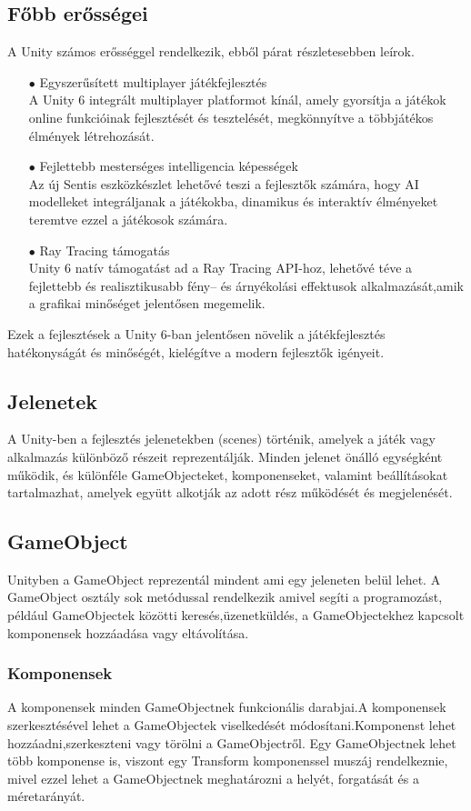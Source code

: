 \documentclass[
]{thesis-ekf}
\theoremstyle{definition}
\theoremstyle{remark}
\begin{document}
\subsection{Főbb erősségei}
A Unity számos erősséggel rendelkezik, ebből párat részletesebben leírok.
\begin{itemize}
	\item[$\bullet$]Egyszerűsített multiplayer játékfejlesztés \\  A Unity 6 integrált multiplayer platformot kínál, amely gyorsítja a játékok online funkcióinak fejlesztését és tesztelését, megkönnyítve a többjátékos élmények létrehozását. 
	\item[$\bullet$]Fejlettebb mesterséges intelligencia képességek \\Az új Sentis eszközkészlet lehetővé teszi a fejlesztők számára, hogy AI modelleket integráljanak a játékokba, dinamikus és interaktív élményeket teremtve ezzel a játékosok számára. 
	\item[$\bullet$]Ray Tracing támogatás \\  Unity 6 natív támogatást ad a Ray Tracing API-hoz, lehetővé téve a fejlettebb és realisztikusabb fény-- és árnyékolási effektusok alkalmazását,amik a grafikai minőséget jelentősen megemelik.
\end{itemize}
Ezek a fejlesztések a Unity 6-ban jelentősen növelik a játékfejlesztés hatékonyságát és minőségét, kielégítve a modern fejlesztők igényeit.\cite{Unity6}


\subsection{Jelenetek}
A Unity-ben a fejlesztés jelenetekben (scenes) történik, amelyek a játék vagy alkalmazás különböző részeit reprezentálják. Minden jelenet önálló egységként működik, és különféle GameObjecteket, komponenseket, valamint beállításokat tartalmazhat, amelyek együtt alkotják az adott rész működését és megjelenését.\cite{UnityScene}
\subsection{GameObject}
Unityben a GameObject reprezentál mindent ami egy jeleneten belül lehet. A GameObject osztály sok metódussal rendelkezik amivel segíti a programozást, például GameObjectek közötti keresés,üzenetküldés, a GameObjectekhez kapcsolt komponensek hozzáadása vagy eltávolítása.\cite{UnityGameObject}

\subsubsection{Komponensek}
A komponensek minden GameObjectnek funkcionális darabjai.A komponensek szerkesztésével lehet a GameObjectek viselkedését módosítani.Komponenst lehet hozzáadni,szerkeszteni vagy törölni a GameObjectről. Egy GameObjectnek lehet több komponense is, viszont egy Transform komponenssel muszáj rendelkeznie, mivel ezzel lehet a GameObjectnek meghatározni a helyét, forgatását és a méretarányát.\cite{UnityComponents}
\end{document}
